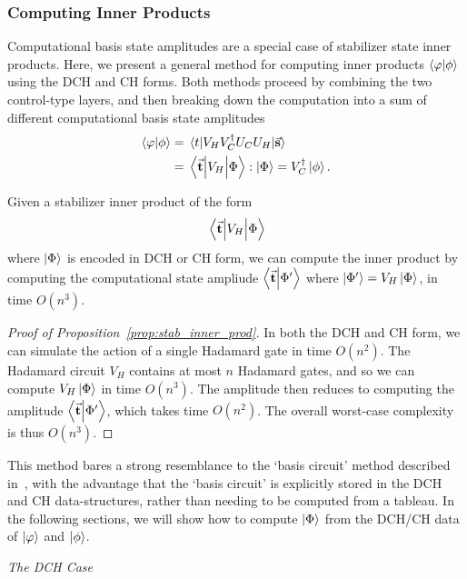 \subsubsection{Computing Inner Products}
Computational basis state amplitudes are a special case of stabilizer state inner products. Here, we present a general method for computing inner products $\braket{\varphi}{\phi}$ using the DCH and CH forms. Both methods proceed by combining the two control-type layers, and then breaking down the computation into a sum of different computational basis state amplitudes
\begin{align*}
\braket{\varphi}{\phi} &= \matrixel{t}{V_{H}V_{C}^{\dagger}U_{C}U_{H}}{\va{s}} \\
&= \matrixel{\va{t}}{V_{H}}{\Phi} : \ket{\Phi} = V_{C}^{\dagger} \ket{\phi}.
\end{align*}
\begin{prop}
Given a stabilizer inner product of the form
\[\matrixel{\va{t}}{V_{H}}{\Phi}\]
where $\ket{\Phi}$ is encoded in DCH or CH form, we can compute the inner product by computing the computational state ampliude $\braket{\va{t}}{\Phi'}$ where $\ket{\Phi'}=V_{H}\ket{\Phi}$, in time $O(n^{3})$.\label{prop:stab_inner_prod}
\end{prop}
\begin{proof}[Proof of Proposition~\ref{prop:stab_inner_prod}]
In both the DCH and CH form, we can simulate the action of a single Hadamard gate in time $O(n^{2})$. The Hadamard circuit $V_{H}$ contains at most $n$ Hadamard gates, and so we can compute $V_{H}\ket{\Phi}$ in time $O(n^{3})$. The amplitude then reduces to computing the amplitude $\braket{\va{t}}{\Phi'}$, which takes time $O(n^{2})$. The overall worst-case complexity is thus $O(n^{3})$.
\end{proof}
This method bares a strong resemblance to the `basis circuit' method described in~\cite{Garcia2012}, with the advantage that the `basis circuit' is explicitly stored in the DCH and CH data-structures, rather than needing to be computed from a  tableau. In the following sections, we will show how to compute $\ket{\Phi}$ from the DCH/CH data of $\ket{\varphi}$ and $\ket{\phi}$.\par
\large{\itshape{The DCH Case}}\\
